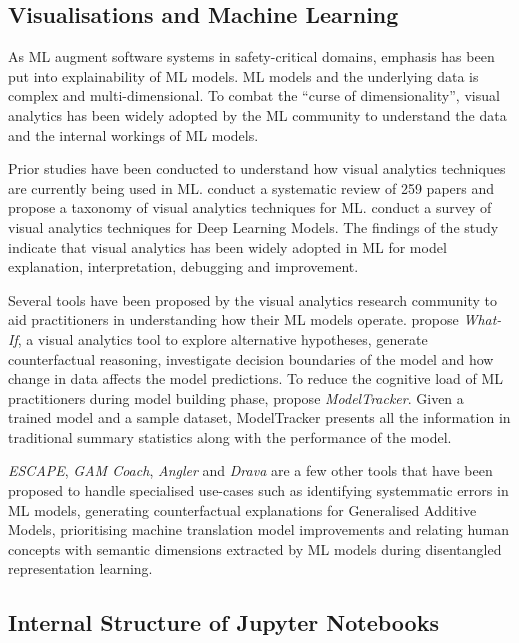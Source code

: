\documentclass[conference]{IEEEtran}
\begin{document}
\subsection{Visualisations and Machine Learning}\label{sec:visualisations}

As ML augment software systems in safety-critical domains, emphasis has been put into explainability of ML models. ML models and the underlying data is complex and multi-dimensional. To combat the ``curse of dimensionality'', visual analytics has been widely adopted by the ML community to understand the data and the internal workings of ML models.

Prior studies have been conducted to understand how visual analytics techniques are currently being used in ML. \cite{yuan2021survey} conduct a systematic review of 259 papers and propose a taxonomy of visual analytics techniques for ML. \cite{hohman2019visual} conduct a survey of visual analytics techniques for Deep Learning Models. The findings of the study indicate that visual analytics has been widely adopted in ML for model explanation, interpretation, debugging and improvement.

Several tools have been proposed by the visual analytics research community to aid practitioners in understanding how their ML models operate. \cite{wexler2020if} propose \textit{What-If}, a visual analytics tool to explore alternative hypotheses, generate counterfactual reasoning, investigate decision boundaries of the model and how change in data affects the model predictions. To reduce the cognitive load of ML practitioners during model building phase, \cite{amershi2015modeltracker} propose \textit{ModelTracker}. Given a trained model and a sample dataset, ModelTracker presents all the information in traditional summary statistics along with the performance of the model.

\textit{ESCAPE}, \textit{GAM Coach}, \textit{Angler} and \textit{Drava} are a few other tools that have been proposed to handle specialised use-cases such as identifying systemmatic errors in ML models, generating counterfactual explanations for Generalised Additive Models, prioritising machine translation model improvements and relating human concepts with semantic dimensions extracted by ML models during disentangled representation learning\cite{ahn2023escape, wang2023gam, robertson2023angler, wang2023drava}.

\subsection{Internal Structure of Jupyter Notebooks}\label{sec:nbformat}
\end{document}

